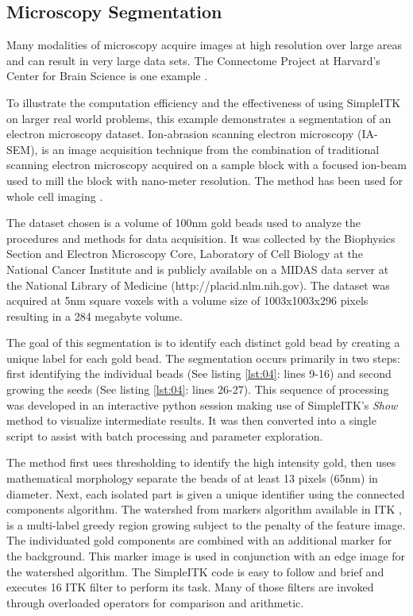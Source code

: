 \documentclass{frontiersMED} %
\begin{document}
\subsection{Microscopy Segmentation}
Many modalities of microscopy acquire images at high resolution over
large areas and can result in very large data sets. The Connectome Project at
Harvard's Center for Brain Science is one example \cite{Seyedhosseini2011}.

To illustrate the computation efficiency and the effectiveness of
using SimpleITK on larger real world problems, this example
demonstrates a segmentation of an electron microscopy
dataset. Ion-abrasion scanning electron microscopy (IA-SEM), is an
image acquisition technique from the combination of traditional
scanning electron microscopy acquired on a sample block with a focused
ion-beam used to mill the block with nano-meter resolution. The method
has been used for whole cell imaging \cite{Murphy2011}.

The dataset chosen is a volume of 100nm gold beads used to analyze the
procedures and methods for data acquisition. It was collected by the
Biophysics Section and Electron Microscopy Core, Laboratory of Cell
Biology at the National Cancer Institute and is publicly available on
a MIDAS data server at the National Library of Medicine
(http://placid.nlm.nih.gov). The dataset was acquired at 5nm square
voxels with a volume size of 1003x1003x296 pixels resulting in a 284
megabyte volume.

The goal of this segmentation is to identify each distinct gold bead
by creating a unique label for each gold bead. The segmentation occurs
primarily in two steps: first identifying the individual beads (See
listing \ref{lst:04}: lines 9-16) and second growing the seeds (See
listing \ref{lst:04}: lines 26-27). This sequence of
processing was developed in an interactive python session making use
of SimpleITK's \textit{Show} method to visualize intermediate results. It was
then converted into a single script to assist with batch processing
and parameter exploration.



The method first uses thresholding to identify the high intensity gold,
then uses mathematical morphology separate the beads of at least 13 pixels
(65nm) in diameter. Next, each isolated part is given a unique
identifier using the connected components algorithm. The watershed from
markers algorithm available in ITK \cite{Beare2006}, is
a multi-label greedy region growing subject to the penalty of the
feature image. The individuated gold components are combined with an
additional marker for the background. This marker image is used in
conjunction with an edge image for the watershed algorithm. The
SimpleITK code is easy to follow and brief and executes 16 ITK filter
to perform its task. Many of those filters are invoked through
overloaded operators for comparison and arithmetic.
\end{document}
